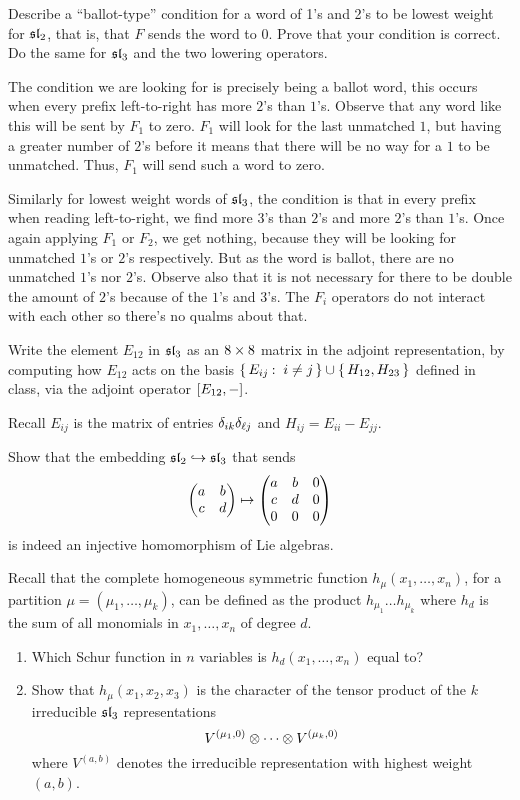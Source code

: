 \documentclass[12pt]{memoir}
\begin{document}
\begin{Ej}
    Describe a ``ballot-type'' condition for a word of 1's and 2's to be lowest weight for $\mathfrak{sl}_2$, that is, that $F$ sends the word to $0$. Prove that your condition is correct. Do the same for $\mathfrak{sl}_3$ and the two lowering operators.
\end{Ej}

\begin{ptcbr}
   The condition we are looking for is precisely being a ballot word, this occurs when every prefix left-to-right has more $2$'s than $1$'s. Observe that any word like this will be sent by $F_1$ to zero. $F_1$ will look for the last unmatched $1$, but having a greater number of $2$'s before it means that there will be no way for a $1$ to be unmatched. Thus, $F_1$ will send such a word to zero.\par
   Similarly for lowest weight words of $\mathfrak{sl}_3$, the condition is that in every prefix when reading left-to-right, we find more $3$'s than $2$'s and more $2$'s than $1$'s. Once again applying $F_1$ or $F_2$, we get nothing, because they will be looking for unmatched $1$'s or $2$'s respectively. But as the word is ballot, there are no unmatched $1$'s nor $2$'s. Observe also that it is not necessary for there to be double the amount of $2$'s because of the $1$'s and $3$'s. The $F_i$ operators do not interact with each other so there's no qualms about that.
\end{ptcbr}

\begin{Ej}
    Write the element $E_{12}$ in $\mathfrak{sl}_3$ as an $8\times 8$ matrix in the adjoint representation, by computing
how $E_{12}$ acts on the basis $\{\,E_{ij}\mathbin{:}\ i\neq j\,\} \cup\{\,H_{12}, H_{23}\,\}$ defined in class, via the adjoint operator $\left\lbrack E_{12},-\right\rbrack$.
\end{Ej}

\begin{ptcbr}
    Recall $E_{ij}$ is the matrix of entries $\delta_{ik}\delta_{\ell j}$ and $H_{ij}=E_{ii}-E_{jj}$.
\end{ptcbr}

\begin{Ej}
    Show that the embedding $\mathfrak{sl}_2\hookrightarrow\mathfrak{sl}_3$ that sends 
    $$\begin{pmatrix} a & b \\ c & d \end{pmatrix}\mapsto\begin{pmatrix} a & b & 0 \\ c & d & 0 \\ 0 & 0 & 0 \end{pmatrix}$$
    is indeed an injective homomorphism of Lie algebras.
\end{Ej}
\begin{Ej}
    Recall that the complete homogeneous symmetric function $h_\mu(x_1,\dots,x_n)$, for a partition $\mu=(\mu_1,\dots,\mu_k)$,
can be deﬁned as the product $h_{\mu_1}\dots h_{\mu_k}$ where $h_d$ is the sum of all monomials in $x_1,\dots,x_n$ of degree $d$.
\begin{enumerate}
    \item Which Schur function in $n$ variables is $h_d(x_1,\dots,x_n) $ equal to?
    \item Show that $h_\mu(x_1, x_2, x_3)$ is the character of the tensor product of the $k$ irreducible $\mathfrak{sl}_3$ representations
    $$V^{(\mu_1,0)}\otimes\cdots\otimes V^{(\mu_k,0)}$$
    where $V^{(a,b)}$ denotes the irreducible representation with highest weight $(a, b)$.
\end{enumerate}
\end{Ej}
\end{document}
